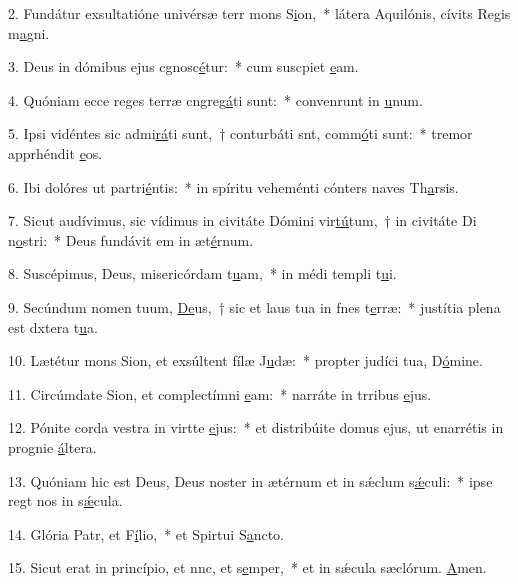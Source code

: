 2. Fundátur exsultatióne univérsæ terr mons S\uline{i}on,~* látera Aquilónis, cívits Regis m\uline{a}gni.\par 
3. Deus in dómibus ejus cgnosc\uline{é}tur:~* cum suscpiet \uline{e}am.\par 
4. Quóniam ecce reges terræ cngreg\uline{á}ti sunt:~* convenrunt in \uline{u}num.\par 
5. Ipsi vidéntes sic admi\uline{rá}ti sunt,~† conturbáti snt, comm\uline{ó}ti sunt:~* tremor apprhéndit \uline{e}os.\par 
6. Ibi dolóres ut partri\uline{é}ntis:~* in spíritu veheménti cónters naves Th\uline{a}rsis.\par 
7. Sicut audívimus, sic vídimus in civitáte Dómini vir\uline{tú}tum,~† in civitáte Di n\uline{o}stri:~* Deus fundávit em in æt\uline{é}rnum.\par 
8. Suscépimus, Deus, misericórdam t\uline{u}am,~* in médi templi t\uline{u}i.\par 
9. Secúndum nomen tuum, \uline{De}us,~† sic et laus tua in fnes t\uline{e}rræ:~* justítia plena est dxtera t\uline{u}a.\par 
10. Lætétur mons Sion, et exsúltent fílæ J\uline{u}dæ:~* propter judíci tua, D\uline{ó}mine.\par 
11. Circúmdate Sion, et complectímni \uline{e}am:~* narráte in trribus \uline{e}jus.\par 
12. Pónite corda vestra in virtte \uline{e}jus:~* et distribúite domus ejus, ut enarrétis in prognie \uline{á}ltera.\par 
13. Quóniam hic est Deus, Deus noster in ætérnum et in sǽclum s\uline{ǽ}culi:~* ipse regt nos in s\uline{ǽ}cula.\par 
14. Glória Patr, et F\uline{í}lio,~* et Spirtui S\uline{a}ncto.\par 
15. Sicut erat in princípio, et nnc, et s\uline{e}mper,~* et in sǽcula sæclórum. \uline{A}men.\par 
